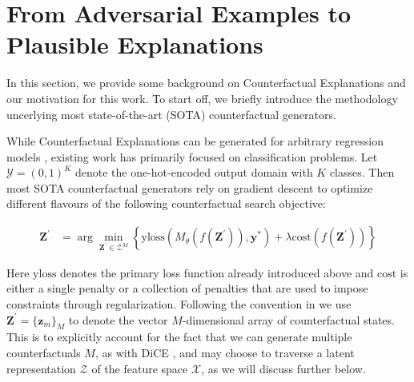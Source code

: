 \documentclass{article}
\begin{document}
\section{From Adversarial Examples to Plausible Explanations}\label{background}

In this section, we provide some background on Counterfactual Explanations and our motivation for this work. To start off, we briefly introduce the methodology uncerlying most state-of-the-art (SOTA) counterfactual generators.

While Counterfactual Explanations can be generated for arbitrary regression models \citep{spooner2021counterfactual}, existing work has primarily focused on classification problems. Let $\mathcal{Y}=(0,1)^K$ denote the one-hot-encoded output domain with $K$ classes. Then most SOTA counterfactual generators rely on gradient descent to optimize different flavours of the following counterfactual search objective:

\begin{equation} \label{eq:general}
\begin{aligned}
\mathbf{Z}^\prime &= \arg \min_{\mathbf{Z}^\prime \in \mathcal{Z}^M} \left\{  {\text{yloss}(M_{\theta}(f(\mathbf{Z}^\prime)),\mathbf{y}^*)}+ \lambda {\text{cost}(f(\mathbf{Z}^\prime)) }  \right\} 
\end{aligned} 
\end{equation}

Here $\text{yloss}$ denotes the primary loss function already introduced above and $\text{cost}$ is either a single penalty or a collection of penalties that are used to impose constraints through regularization. Following the convention in \citet{altmeyer2023endogenous} we use $\mathbf{Z}^\prime=\{ \mathbf{z}_m\}_M$ to denote the vector $M$-dimensional array of counterfactual states. This is to explicitly account for the fact that we can generate multiple counterfactuals $M$, as with DiCE \citep{mothilal2020explaining}, and may choose to traverse a latent representation $\mathcal{Z}$ of the feature space $\mathcal{X}$, as we will discuss further below. 
\end{document}
